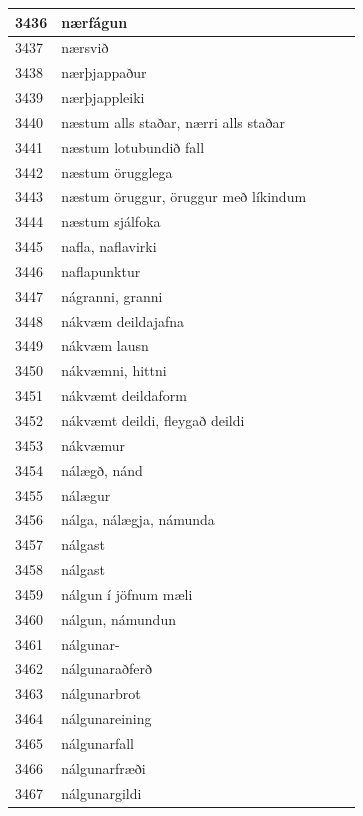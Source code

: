 \begin{longtable}{p{}|p{}|p{}|p{}|p{}}
\hline
3436 & nærfágun &  &  &  \\
\hline
3437 & nærsvið &  &  &  \\
\hline
3438 & nærþjappaður &  &  &  \\
\hline
3439 & nærþjappleiki &  &  &  \\
\hline
3440 & næstum alls staðar, nærri alls staðar &  &  &  \\
\hline
3441 & næstum lotubundið fall &  &  &  \\
\hline
3442 & næstum örugglega &  &  &  \\
\hline
3443 & næstum öruggur, öruggur með líkindum &  &  &  \\
\hline
3444 & næstum sjálfoka &  &  &  \\
\hline
3445 & nafla, naflavirki &  &  &  \\
\hline
3446 & naflapunktur &  &  &  \\
\hline
3447 & nágranni, granni &  &  &  \\
\hline
3448 & nákvæm deildajafna &  &  &  \\
\hline
3449 & nákvæm lausn &  &  &  \\
\hline
3450 & nákvæmni, hittni &  &  &  \\
\hline
3451 & nákvæmt deildaform &  &  &  \\
\hline
3452 & nákvæmt deildi, fleygað deildi &  &  &  \\
\hline
3453 & nákvæmur &  &  &  \\
\hline
3454 & nálægð, nánd &  &  &  \\
\hline
3455 & nálægur &  &  &  \\
\hline
3456 & nálga, nálægja, námunda &  &  &  \\
\hline
3457 & nálgast &  &  &  \\
\hline
3458 & nálgast &  &  &  \\
\hline
3459 & nálgun í jöfnum mæli &  &  &  \\
\hline
3460 & nálgun, námundun &  &  &  \\
\hline
3461 & nálgunar- &  &  &  \\
\hline
3462 & nálgunaraðferð &  &  &  \\
\hline
3463 & nálgunarbrot &  &  &  \\
\hline
3464 & nálgunareining &  &  &  \\
\hline
3465 & nálgunarfall &  &  &  \\
\hline
3466 & nálgunarfræði &  &  &  \\
\hline
3467 & nálgunargildi &  &  &  \\

\end{longtable}
